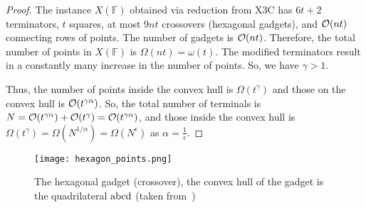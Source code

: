 \begin{proof}
    The instance $X(\mathbb{F})$ obtained via reduction from X3C has $6t+2$ terminators, $t$ squares, at most $9nt$ crossovers (hexagonal gadgets), and $\mathcal{O}(nt)$ connecting rows of points. The number of gadgets is $\mathcal{O}(nt)$. Therefore, the total number of points in $X(\mathbb{F})$ is $\Omega(nt) = \omega(t)$. The modified terminators result in a constantly many increase in the number of points. So, we have $\gamma > 1$.

    Thus, the number of points inside the convex hull is $\Omega(t^\gamma)$ and those on the convex hull is $\mathcal{O}(t^{\gamma\alpha})$. So, the total number of terminals is $N = \mathcal{O}(t^{\gamma\alpha}) + \mathcal{O}(t^{\gamma}) = \mathcal{O}(t^{\gamma\alpha})$, and those inside the convex hull is $\Omega(t^\gamma) = \Omega(N^{1/\alpha}) = \Omega(N^\epsilon)$ as $\alpha = \frac{1}{\epsilon}$.
\end{proof}

\begin{figure}[h]
\centering
\texttt{[image: hexagon\_points.png]}
\caption{The hexagonal gadget (crossover), the convex hull of the gadget is the quadrilateral $\rm abcd$ (taken from~\cite{garey1977complexity})}
\label{fig:hexagon_points}
\end{figure}


    


